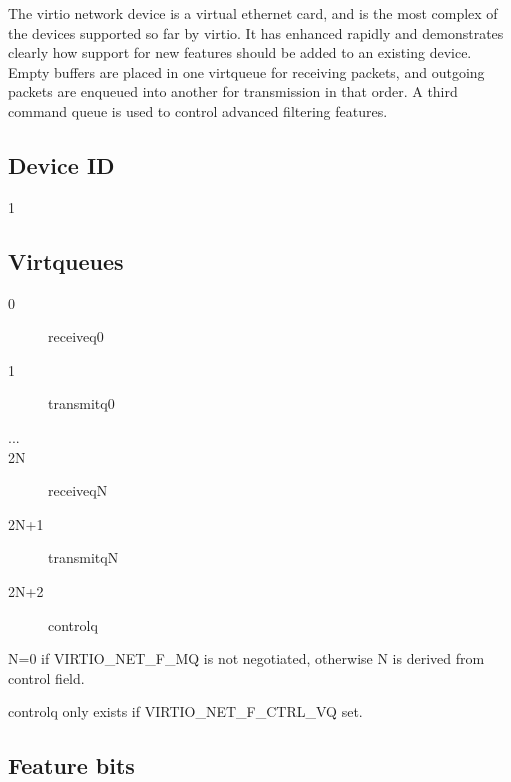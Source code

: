The virtio network device is a virtual ethernet card, and is the
most complex of the devices supported so far by virtio. It has
enhanced rapidly and demonstrates clearly how support for new
features should be added to an existing device. Empty buffers are
placed in one virtqueue for receiving packets, and outgoing
packets are enqueued into another for transmission in that order.
A third command queue is used to control advanced filtering
features.

\subsection{Device ID}\label{sec:Device Types / Network Device / Device ID}

 1

\subsection{Virtqueues}\label{sec:Device Types / Network Device / Virtqueues}

\begin{description}
\item[0] receiveq0
\item[1] transmitq0
\item[...]
\item[2N] receiveqN
\item[2N+1] transmitqN
\item[2N+2] controlq
\end{description}

 N=0 if VIRTIO_NET_F_MQ is not negotiated, otherwise N is derived
 from  control field.

 controlq only exists if VIRTIO_NET_F_CTRL_VQ set.

\subsection{Feature bits}\label{sec:Device Types / Network Device / Feature bits}

